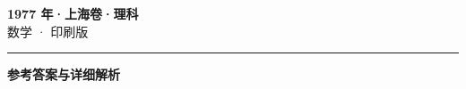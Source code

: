 \documentclass[zihao=5, a4paper]{ctexart}
\begin{document}
\begin{center}
  {\Large\bfseries 1977 年·上海卷·理科}\\[4pt]
  {\large 数学 · 印刷版}
\end{center}
\medskip
{}

\par\bigskip\hrule\bigskip
{}
\begin{center}{\large\bfseries 参考答案与详细解析}\end{center}
\smallskip

\end{document}
